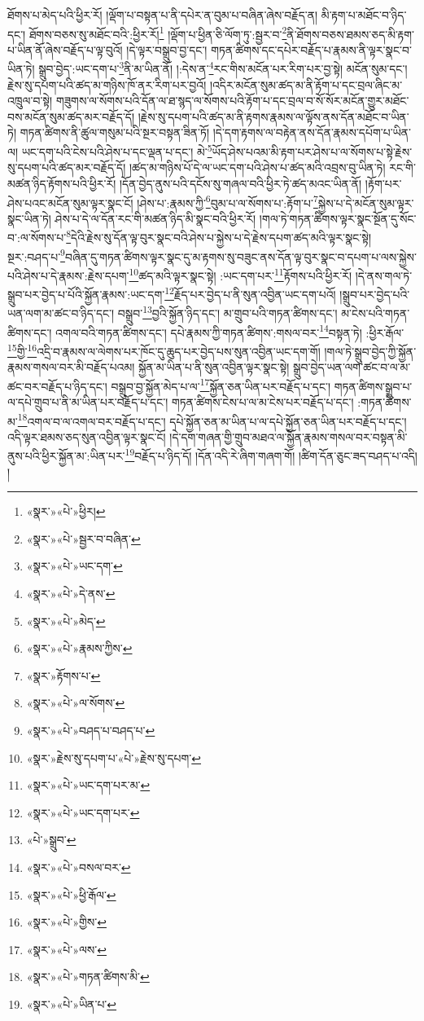 ཐོགས་པ་མེད་པའི་ཕྱིར་རོ། །ལྡོག་པ་བསྟན་པ་ནི་དཔེར་ན་བུམ་པ་བཞིན་ཞེས་བརྗོད་ན། མི་རྟག་པ་མཐོང་བ་ཉིད་དང་། ཐོགས་བཅས་སུ་མཐོང་བའི་:ཕྱིར་རོ།\footnote{«སྣར་»«པེ་»ཕྱིར།} །ལྡོག་པ་ཕྱིན་ཅི་ལོག་ཏུ་:སྦྱར་བ་\footnote{«སྣར་»«པེ་»སྦྱར་བ་བཞིན་}ནི་ཐོགས་བཅས་ཐམས་ཅད་མི་རྟག་པ་ཡིན་ནོ་ཞེས་བརྗོད་པ་ལྟ་བུའོ། །དེ་ལྟར་བསྒྲུབ་བྱ་དང་། གཏན་ཚིགས་དང་དཔེར་བརྗོད་པ་རྣམས་ནི་ལྟར་སྣང་བ་ཡིན་ཏེ། སྒྲུབ་བྱེད་:ཡང་དག་པ་\footnote{«སྣར་»«པེ་»ཡང་དག་}ནི་མ་ཡིན་ནོ། །:དེས་ན་\footnote{«སྣར་»«པེ་»དེ་ནས་}རང་གིས་མངོན་པར་རིག་པར་བྱ་སྟེ། མངོན་སུམ་དང་། རྗེས་སུ་དཔག་པའི་ཚད་མ་གཉིས་ཁོ་ནར་རིག་པར་བྱའོ། །འདིར་མངོན་སུམ་ཚད་མ་ནི་རྟོག་པ་དང་བྲལ་ཞིང་མ་འཁྲུལ་བ་སྟེ། གཟུགས་ལ་སོགས་པའི་དོན་ལ་ཐ་སྙད་ལ་སོགས་པའི་རྟོག་པ་དང་བྲལ་བ་སོ་སོར་མངོན་གྱུར་མཐོང་བས་མངོན་སུམ་ཚད་མར་བརྗོད་དོ། །རྗེས་སུ་དཔག་པའི་ཚད་མ་ནི་རྟགས་རྣམས་ལ་ལྟོས་ནས་དོན་མཐོང་བ་ཡིན་ཏེ། གཏན་ཚིགས་ནི་ཚུལ་གསུམ་པའི་སྔར་བསྟན་ཟིན་ཏོ། །དེ་དག་རྟགས་ལ་བརྟེན་ནས་དོན་རྣམས་དཔོག་པ་ཡིན་ལ། ཡང་དག་པའི་ངེས་པའི་ཤེས་པ་དང་ལྡན་པ་དང་། མེ་\footnote{«སྣར་»«པེ་»མེད་}ཡོད་ཤེས་པའམ་མི་རྟག་པར་ཤེས་པ་ལ་སོགས་པ་སྟེ་རྗེས་སུ་དཔག་པའི་ཚད་མར་བརྗོད་དོ། །ཚད་མ་གཉིས་པོ་དེ་ལ་ཡང་དག་པའི་ཤེས་པ་ཚད་མའི་འབྲས་བུ་ཡིན་ཏེ། རང་གི་མཚན་ཉིད་རྟོགས་པའི་ཕྱིར་རོ། །དོན་བྱེད་ནུས་པའི་དངོས་སུ་གཞལ་བའི་ཕྱིར་ཏེ་ཚད་མའང་ཡིན་ནོ། །རྟོག་པར་ཤེས་པའང་མངོན་སུམ་ལྟར་སྣང་ངོ། །ཤེས་པ་:རྣམས་ཀྱི་\footnote{«སྣར་»«པེ་»རྣམས་ཀྱིས་}བུམ་པ་ལ་སོགས་པ་:རྟོག་པ་\footnote{«སྣར་»རྟོགས་པ་}སྐྱེས་པ་དེ་མངོན་སུམ་ལྟར་སྣང་ཡིན་ཏེ། ཤེས་པ་དེ་ལ་དོན་རང་གི་མཚན་ཉིད་མི་སྣང་བའི་ཕྱིར་རོ། །གལ་ཏེ་གཏན་ཚིགས་ལྟར་སྣང་སྔོན་དུ་སོང་བ་:ལ་སོགས་པ་\footnote{«སྣར་»«པེ་»ལ་སོགས་}དེའི་རྗེས་སུ་དོན་ལྟ་བུར་སྣང་བའི་ཤེས་པ་སྐྱེས་པ་དེ་རྗེས་དཔག་ཚད་མའི་ལྟར་སྣང་སྟེ། སྔར་:བཤད་པ་\footnote{«སྣར་»«པེ་»བཤད་པ་བཤད་པ་}བཞིན་དུ་གཏན་ཚིགས་ལྟར་སྣང་དུ་མ་རྟགས་སུ་བཟུང་ནས་དོན་ལྟ་བུར་སྣང་བ་དཔག་པ་ལས་སྐྱེས་པའི་ཤེས་པ་དེ་རྣམས་:རྗེས་དཔག་\footnote{«སྣར་»རྗེས་སུ་དཔག་པ་«པེ་»རྗེས་སུ་དཔག་}ཚད་མའི་ལྟར་སྣང་སྟེ། :ཡང་དག་པར་\footnote{«སྣར་»«པེ་»ཡང་དག་པར་མ་}རྟོགས་པའི་ཕྱིར་རོ། །དེ་ནས་གལ་ཏེ་སྒྲུབ་པར་བྱེད་པ་པོའི་སྐྱོན་རྣམས་:ཡང་དག་\footnote{«སྣར་»«པེ་»ཡང་དག་པར་}རྗོད་པར་བྱེད་པ་ནི་སུན་འབྱིན་ཡང་དག་པའོ། །སྒྲུབ་པར་བྱེད་པའི་ཡན་ལག་མ་ཚང་བ་ཉིད་དང་། བསྒྲུབ་\footnote{«པེ་»སྒྲུབ་}བྱའི་སྐྱོན་ཉིད་དང་། མ་གྲུབ་པའི་གཏན་ཚིགས་དང་། མ་ངེས་པའི་གཏན་ཚིགས་དང་། འགལ་བའི་གཏན་ཚིགས་དང་། དཔེ་རྣམས་ཀྱི་གཏན་ཚིགས་:གསལ་བར་\footnote{«སྣར་»«པེ་»བསལ་བར་}བསྟན་ཏེ། :ཕྱིར་རྒོལ་\footnote{«སྣར་»«པེ་»ཕྱི་རྒོལ་}གྱི་\footnote{«སྣར་»«པེ་»གྱིས་}འདྲི་བ་རྣམས་ལ་ལེགས་པར་ཁོང་དུ་ཆུད་པར་བྱེད་པས་སུན་འབྱིན་ཡང་དག་གོ། །གལ་ཏེ་སྒྲུབ་བྱེད་ཀྱི་སྐྱོན་རྣམས་གསལ་བར་མི་བརྗོད་པའམ། སྐྱོན་མ་ཡིན་པ་ནི་སུན་འབྱིན་ལྟར་སྣང་སྟེ། སྒྲུབ་བྱེད་ཡན་ལག་ཚང་བ་ལ་མ་ཚང་བར་བརྗོད་པ་ཉིད་དང་། བསྒྲུབ་བྱ་སྐྱོན་མེད་པ་ལ་\footnote{«སྣར་»«པེ་»ལས་}སྐྱོན་ཅན་ཡིན་པར་བརྗོད་པ་དང་། གཏན་ཚིགས་སྒྲུབ་པ་ལ་དཔེ་གྲུབ་པ་ནི་མ་ཡིན་པར་བརྗོད་པ་དང་། གཏན་ཚིགས་ངེས་པ་ལ་མ་ངེས་པར་བརྗོད་པ་དང་། :གཏན་ཚིགས་མ་\footnote{«སྣར་»«པེ་»གཏན་ཚིགས་མི་}འགལ་བ་ལ་འགལ་བར་བརྗོད་པ་དང་། དཔེ་སྐྱོན་ཅན་མ་ཡིན་པ་ལ་དཔེ་སྐྱོན་ཅན་ཡིན་པར་བརྗོད་པ་དང་། འདི་ལྟར་ཐམས་ཅད་སུན་འབྱིན་ལྟར་སྣང་ངོ། །དེ་དག་གཞན་གྱི་གྲུབ་མཐའ་ལ་སྐྱོན་རྣམས་གསལ་བར་བསྟན་མི་ནུས་པའི་ཕྱིར་སྐྱོན་མ་:ཡིན་པར་\footnote{«སྣར་»«པེ་»ཡིན་པ་}བརྗོད་པ་ཉིད་དོ། །དོན་འདི་རེ་ཞིག་གཞག་གོ། །ཚིག་དོན་ཅུང་ཟད་བཤད་པ་འདི། །
